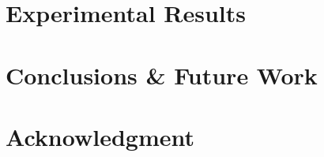 \documentclass[letterpaper, 10 pt, conference]{ieeeconf}  %
\begin{document}
\section{Experimental Results}\label{sec:exp}
\section{Conclusions \& Future Work}\label{sec:conclusion}

\section*{Acknowledgment}


%
%
%


\end{document}

